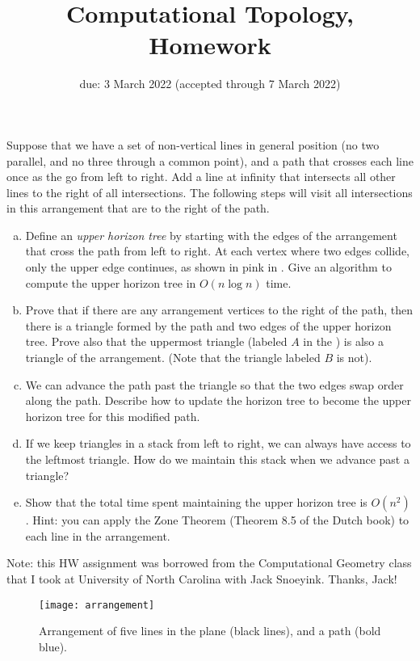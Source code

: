 \documentclass{article}
\title{Computational Topology, Homework \hwnum}
\author{\todo{your name here}}
\date{due: 3 March 2022 (accepted through 7 March 2022)}
\begin{document}
\maketitle




Suppose that we have a set of non-vertical lines in general position (no two
parallel, and no three through a common point), and a path that crosses each
line once as the go from left to right.  Add a line at infinity that intersects
all other lines to the right of all intersections.  The following steps will
visit all intersections in this arrangement that are to the right of the path.

\begin{enumerate}[(a)]
    \item Define an \emph{upper horizon tree} by starting with the edges of the
        arrangement that cross the path from left to right. At each vertex where
        two edges collide, only the upper edge continues, as shown in pink in
        . Give an algorithm to
        compute the upper horizon tree in $O(n \log n)$ time.
    \item Prove that if there are any arrangement vertices to the right of the
        path, then there is a triangle formed by the path and two edges of the
        upper horizon tree.  Prove also that the uppermost triangle (labeled
        $A$ in the ) is also a triangle of the arrangement.  (Note that
        the triangle labeled $B$ is not).
    \item We can advance the path past the triangle so that the two edges swap
        order along the path.  Describe how to update the horizon tree to become
        the upper horizon tree for this modified path.
    \item If we keep triangles in a stack from left to right, we can always have
        access to the leftmost triangle.  How do we maintain this stack when we
        advance past a triangle?
    \item Show that the total time spent maintaining the upper horizon tree is
        $O(n^2)$.  Hint: you can apply the Zone Theorem (Theorem 8.5 of the
        Dutch book) to each line in the arrangement.
\end{enumerate}

Note: this HW assignment was borrowed from the Computational Geometry class that
I took at University of North Carolina with Jack Snoeyink.  Thanks, Jack!

\begin{figure}[bht]
    \centering
    \texttt{[image: arrangement]}
    \caption{Arrangement of five lines in the plane (black lines), and a path
    (bold blue).}\label{fig:arrangement}
\end{figure}
\end{document}
